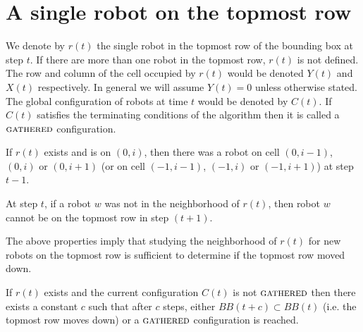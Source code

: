 \newcommand{\Gathered}{\ensuremath{\textsc{gathered}}\xspace}

\section{A single robot on the topmost row}

We denote by $r(t)$ the single robot in the topmost row of the bounding box at step
$t$. If there are more than one robot in the topmost row, $r(t)$ is not defined.
The row and column of the cell occupied by $r(t)$ would be denoted $Y(t)$ and $X(t)$ respectively. In general we will assume $Y(t)=0$ unless otherwise stated. 
The global configuration of robots at time $t$ would be denoted by $C(t)$. If $C(t)$ satisfies the terminating conditions of the algorithm then it is called a \Gathered configuration.

\begin{prop}
If $r(t)$ exists and is on $(0,i)$, then there was a robot on cell $(0,i-1)$, $(0,i)$
or $(0,i+1)$ (or on cell $(-1,i-1)$, $(-1,i)$ or $(-1,i+1)$) at step $t-1$.
\end{prop}

\begin{prop}
At step $t$, if a robot $w$ was not in the neighborhood of $r(t)$, then robot $w$ cannot be on the topmost row in step $(t+1)$.
\end{prop}

The above properties imply that studying the neighborhood of $r(t)$ for new robots on the
topmost row is sufficient to determine if the topmost row moved down.

\begin{lem}
If $r(t)$ exists and the current configuration $C(t)$ is not  \Gathered then there exists a constant $c$ such that 
after $c$ steps, either $BB(t+c) \subset BB(t)$ (i.e. the topmost row moves
down) or a \Gathered configuration is reached.
\end{lem}

